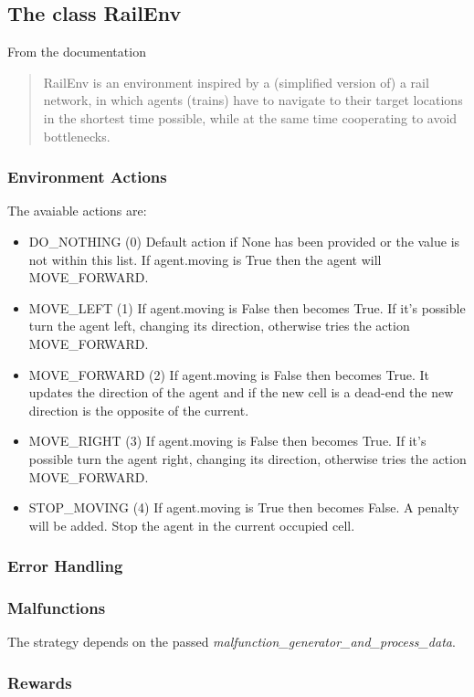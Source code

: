 \documentclass[12pt, a4paper, hidelinks]{article}
\begin{document}
\subsection{The class RailEnv}

From the documentation
\begin{quotation}
	RailEnv is an environment inspired by a (simplified version of) a rail
    network, in which agents (trains) have to navigate to their target
    locations in the shortest time possible, while at the same time cooperating
    to avoid bottlenecks.
\end{quotation}

\subsubsection*{Environment Actions}
The avaiable actions are:
\begin{itemize}
	\item DO\_NOTHING (0) Default action if None has been provided or the value is not within this list. If agent.moving is True then the agent will MOVE\_FORWARD\@.
    \item MOVE\_LEFT (1) If agent.moving is False then becomes True. If it's possible turn the agent left, changing its direction, otherwise tries the action MOVE\_FORWARD\@.
    \item MOVE\_FORWARD (2) If agent.moving is False then becomes True. It updates the direction of the agent and if the new cell is a dead-end the new direction is the opposite of the current.
    \item MOVE\_RIGHT (3) If agent.moving is False then becomes True. If it's possible turn the agent right, changing its direction, otherwise tries the action MOVE\_FORWARD\@.
    \item STOP\_MOVING (4) If agent.moving is True then becomes False. A penalty will be added. Stop the agent in the current occupied cell.
\end{itemize}

\subsubsection*{Error Handling}

\subsubsection*{Malfunctions}
The strategy depends on the passed \textit{malfunction_generator_and_process_data}.

\subsubsection*{Rewards}

\newpage
%
%
\end{document}
